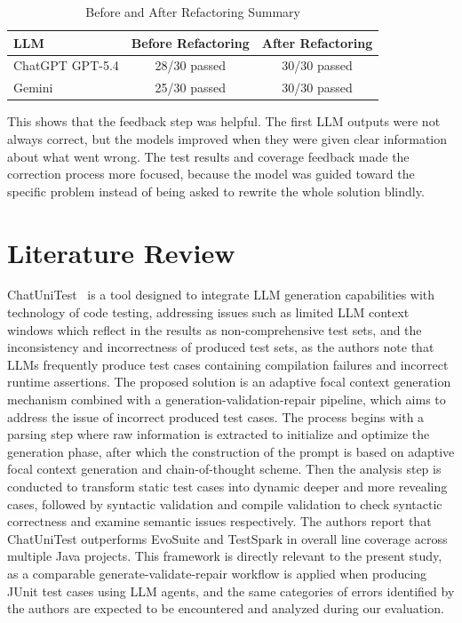 \documentclass[journal]{IEEEtran}
\begin{document}
\begin{table}[!t]
\renewcommand{\arraystretch}{1.2}
\caption{Before and After Refactoring Summary}
\label{tab:refactoring-summary}
\centering
\begin{tabular}{lcc}
\toprule
\textbf{LLM} & \textbf{Before Refactoring} & \textbf{After Refactoring} \\
\midrule
ChatGPT GPT-5.4 & 28/30 passed & 30/30 passed \\
Gemini & 25/30 passed & 30/30 passed \\
\bottomrule
\end{tabular}
\end{table}

This shows that the feedback step was helpful. The first LLM outputs were not always correct, but the models improved when they were given clear information about what went wrong. The test results and coverage feedback made the correction process more focused, because the model was guided toward the specific problem instead of being asked to rewrite the whole solution blindly.

\section{Literature Review}

ChatUniTest~\cite{chatunitest} is a tool designed to integrate LLM generation capabilities with technology of code testing, addressing issues such as limited LLM context windows which reflect in the results as non-comprehensive test sets, and the inconsistency and incorrectness of produced test sets, as the authors note that LLMs frequently produce test cases containing compilation failures and incorrect runtime assertions. The proposed solution is an adaptive focal context generation mechanism combined with a generation-validation-repair pipeline, which aims to address the issue of incorrect produced test cases. The process begins with a parsing step where raw information is extracted to initialize and optimize the generation phase, after which the construction of the prompt is based on adaptive focal context generation and chain-of-thought scheme. Then the analysis step is conducted to transform static test cases into dynamic deeper and more revealing cases, followed by syntactic validation and compile validation to check syntactic correctness and examine semantic issues respectively. The authors report that ChatUniTest outperforms EvoSuite and TestSpark in overall line coverage across multiple Java projects. This framework is directly relevant to the present study, as a comparable generate-validate-repair workflow is applied when producing JUnit test cases using LLM agents, and the same categories of errors identified by the authors are expected to be encountered and analyzed during our evaluation.
\end{document}
